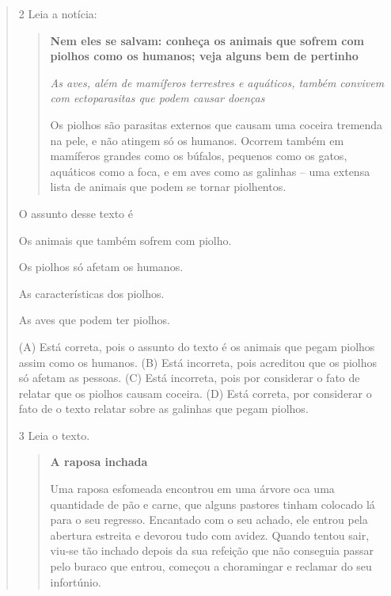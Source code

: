 \begin{verse}
\num{2} Leia a notícia:

\begin{quote}
\textbf{Nem eles se salvam: conheça os animais que sofrem com piolhos
como os humanos; veja alguns bem de pertinho}

\textit{As aves, além de mamíferos terrestres e aquáticos, também convivem com
ectoparasitas que podem causar doenças}

Os piolhos são parasitas externos que causam uma coceira tremenda na
pele, e não atingem só os humanos. Ocorrem também em mamíferos grandes
como os búfalos, pequenos como os gatos, aquáticos como a foca, e em
aves como as galinhas -- uma extensa lista de animais que podem se
tornar piolhentos.
\end{quote}


O assunto desse texto é

\begin{escolha}
\item Os animais que também sofrem com piolho.

\item Os piolhos só afetam os humanos.

\item As características dos piolhos.

\item As aves que podem ter piolhos.
\end{escolha}


(A) Está correta, pois o assunto do texto é os animais que pegam piolhos
assim como os humanos.
(B) Está incorreta, pois acreditou que os piolhos só afetam as pessoas.
(C) Está incorreta, pois por considerar o fato de relatar que os piolhos
causam coceira.
(D) Está correta, por considerar o fato de o texto relatar sobre as
galinhas que pegam piolhos.

\num{3} Leia o texto.

\begin{quote}
\textbf{A raposa inchada}

Uma raposa esfomeada encontrou em uma árvore oca uma quantidade de pão e
carne, que alguns pastores tinham colocado lá para o seu regresso.
Encantado com o seu achado, ele entrou pela abertura estreita e devorou
tudo com avidez. Quando tentou sair, viu-se tão inchado depois da sua
refeição que não conseguia passar pelo buraco que entrou, começou a
choramingar e reclamar do seu infortúnio.
\end{quote}


\end{verse}

